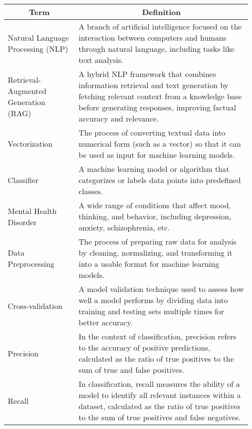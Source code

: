 \begin{center}

\begin{tabular}{|p{4cm}|p{10cm}|}
  \hline
  \multicolumn{1}{|c|}{\textbf{Term}} & \multicolumn{1}{c|}{\textbf{Definition}} \\

  \hline 
  Natural Language Processing (NLP) & A branch of artificial intelligence focused on the interaction between computers and humans through natural language, including tasks like text analysis. \\

  \hline 
  Retrieval-Augmented Generation (RAG) & A hybrid NLP framework that combines information retrieval and text generation by fetching relevant context from a knowledge base before generating responses, improving factual accuracy and relevance. \\


  \hline 
  Vectorization & The process of converting textual data into numerical form (such as a vector) so that it can be used as input for machine learning models. \\

  \hline 
  Classifier & A machine learning model or algorithm that categorizes or labels data points into predefined classes. \\

  \hline
  Mental Health Disorder & A wide range of conditions that affect mood, thinking, and behavior, including depression, anxiety, schizophrenia, etc. \\

  \hline
  Data Preprocessing & The process of preparing raw data for analysis by cleaning, normalizing, and transforming it into a usable format for machine learning models. \\

  \hline 
  Cross-validation & A model validation technique used to assess how well a model performs by dividing data into training and testing sets multiple times for better accuracy. \\

  \hline
  Precision & In the context of classification, precision refers to the accuracy of positive predictions, calculated as the ratio of true positives to the sum of true and false positives. \\

  \hline
  Recall & In classification, recall measures the ability of a model to identify all relevant instances within a dataset, calculated as the ratio of true positives to the sum of true positives and false negatives. \\
  

\end{tabular}
\end{center}
